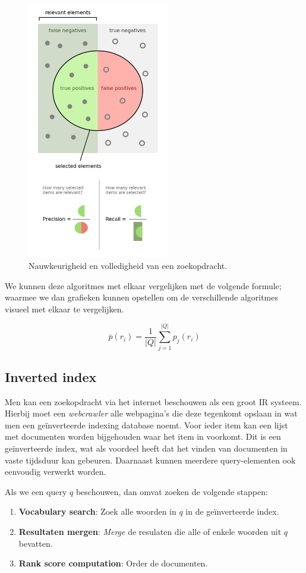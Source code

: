 \begin{figure}[h]
\centering
\caption{Nauwkeurigheid en volledigheid van een zoekopdracht.}
\includegraphics[width=0.55\textwidth]{res/evaluation_queries}
\end{figure}

\newpage
We kunnen deze algoritmes met elkaar vergelijken met de volgende formule; waarmee we dan grafieken kunnen opstellen om de verschillende algoritmes visueel met elkaar te vergelijken.

\begin{equation}
\overline{p}\left(r_i\right)=\frac{1}{|Q|}\sum_{j=1}^{|Q|}{p_j(r_i)}
\end{equation}

%
\subsection{Inverted index}
Men kan een zoekopdracht via het internet beschouwen als een groot IR systeem. Hierbij moet een \emph{webcrawler} alle webpagina's die deze tegenkomt opslaan in wat men een ge\"inverteerde indexing database noemt.
Voor ieder item kan een lijst met documenten worden bijgehouden waar het item in voorkomt. Dit is een ge\"inverteerde index, wat als voordeel heeft dat het vinden van documenten in vaste tijdsduur kan gebeuren. Daarnaast kunnen meerdere query-elementen ook eenvoudig verwerkt worden.

Als we een query $q$ beschouwen, dan omvat zoeken de volgende stappen:

\begin{enumerate}
\item \textbf{Vocabulary search}: Zoek alle woorden in $q$ in de ge\"inverteerde index.
\item \textbf{Resultaten mergen}: \emph{Merge} de resulaten die alle of enkele woorden uit $q$ bevatten.
\item \textbf{Rank score computation}: Order de documenten.
\end{enumerate}


